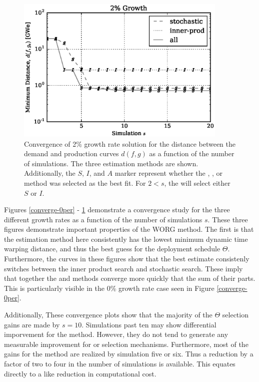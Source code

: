 \begin{figure}[htb]
\centering
\includegraphics[width=0.9\textwidth]{converge-2per.eps}
\caption{Convergence of 2\% growth rate solution for the distance between
the demand and production curves $d(f, g)$ as a function of the number of 
simulations. The three estimation methods are shown. Additionally, the
$S$, $I$, and $A$ marker represent whether the \stochastic, \innerprod, 
or \allflag method was selected as the best fit. For $2 < s$, the \allflag
will select either $S$ or $I$.
}
\label{converge-2per}
\end{figure}

Figures \ref{converge-0per} - \ref{converge-2per} demonstrate a convergence 
study for the three 
different growth rates as a function of the number of simulations $s$.
These three figures demonstrate important properties of the WORG method.
The first is that the \allflag estimation method here consistently has
the lowest minimum dynamic time warping distance, and thus the best guess 
for the deployment schedule $\Theta$.  Furthermore, the \allflag curves
in these figures show that the best estimate consistenly switches
between the inner product search and stochastic search. These imply 
that together the \stochastic and \innerprod methods converge more quickly 
that the sum of their parts.  This is particularly visible in the 0\% growth
rate case seen in Figure \ref{converge-0per}.

Additionally, These convergence plots show that the majority of the 
$\Theta$ selection gains are made by $s=10$.  Simulations past ten may 
show differential imporvement for the \allflag method.  However, they 
do not tend to generate any measurable improvement for \stochastic or
\innerprod selection mechanisms. Furthermore, most of the gains for the 
\allflag method are realized by simulation five or six. Thus a reduction
by a factor of two to four in the number of simulations is available.
This equates directly to a like reduction in computational cost.

